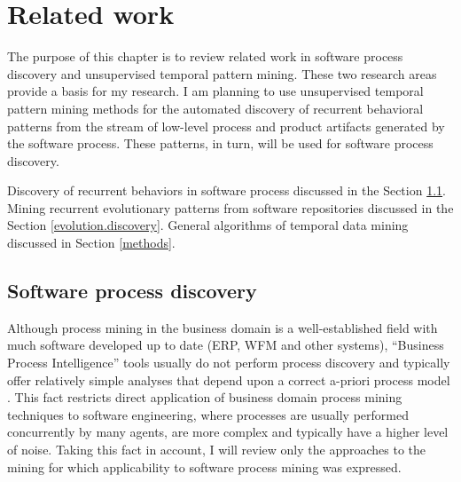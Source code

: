 \chapter{Related work} \label{related.work}
The purpose of this chapter is to review related work in software process discovery and unsupervised temporal pattern mining. These two research areas provide a basis for my research. I am planning to use unsupervised temporal pattern mining methods for the automated discovery of recurrent behavioral patterns from the stream of low-level process and product artifacts generated by the software process. These patterns, in turn, will be used for software process discovery. 

Discovery of recurrent behaviors in software process discussed in the Section \ref{process.discovery}. Mining recurrent evolutionary patterns from software repositories discussed in the Section \ref{evolution.discovery}. General algorithms of temporal data mining discussed in Section \ref{methods}.

\section{Software process discovery}\label{process.discovery} 
Although process mining in the business domain is a well-established field with much software developed up to date (ERP, WFM and other systems), ``Business Process Intelligence'' tools usually do not perform process discovery and typically offer relatively simple analyses that depend upon a correct a-priori process model \cite{citeulike:3718014} \cite{citeulike:5044991}. This fact restricts direct application of business domain process mining techniques to software engineering, where processes are usually performed concurrently by many agents, are more complex and typically have a higher level of noise. Taking this fact in account, I will review only the approaches to the mining for which applicability to software process mining was expressed. 

